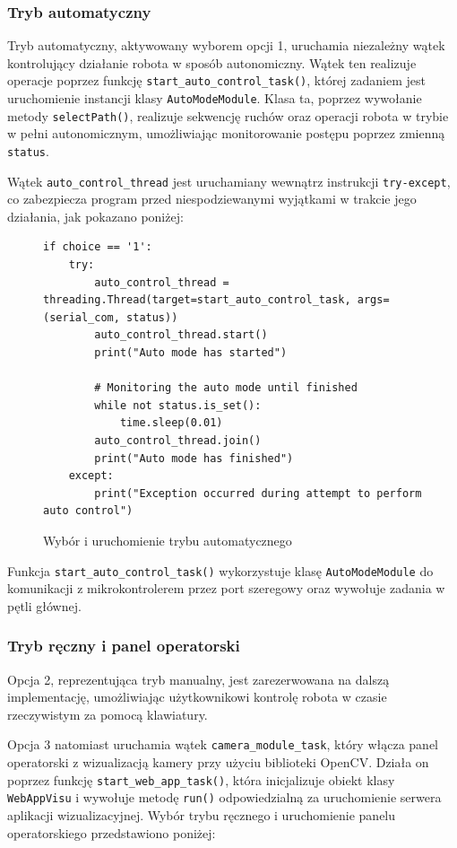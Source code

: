 \subsubsection{Tryb automatyczny}

Tryb automatyczny, aktywowany wyborem opcji 1, uruchamia niezależny wątek kontrolujący działanie robota w sposób autonomiczny. Wątek ten realizuje operacje poprzez funkcję \texttt{start\_auto\_control\_task()}, której zadaniem jest uruchomienie instancji klasy \texttt{AutoModeModule}. Klasa ta, poprzez wywołanie metody \texttt{selectPath()}, realizuje sekwencję ruchów oraz operacji robota w trybie w pełni autonomicznym, umożliwiając monitorowanie postępu poprzez zmienną \texttt{status}.

Wątek \texttt{auto\_control\_thread} jest uruchamiany wewnątrz instrukcji \texttt{try-except}, co zabezpiecza program przed niespodziewanymi wyjątkami w trakcie jego działania, jak pokazano poniżej:

\begin{figure}[h!]
  \centering
  \begin{lstlisting}
if choice == '1':
    try:
        auto_control_thread = threading.Thread(target=start_auto_control_task, args=(serial_com, status))
        auto_control_thread.start()
        print("Auto mode has started")

        # Monitoring the auto mode until finished
        while not status.is_set():
            time.sleep(0.01)
        auto_control_thread.join()
        print("Auto mode has finished")
    except:
        print("Exception occurred during attempt to perform auto control")
  \end{lstlisting}
  \caption{Wybór i uruchomienie trybu automatycznego}
  \label{fig:automode_choice}
\end{figure}

Funkcja \texttt{start\_auto\_control\_task()} wykorzystuje klasę \texttt{AutoModeModule} do komunikacji z mikrokontrolerem przez port szeregowy oraz wywołuje zadania w pętli głównej.

\subsubsection{Tryb ręczny i panel operatorski}

Opcja 2, reprezentująca tryb manualny, jest zarezerwowana na dalszą implementację, umożliwiając użytkownikowi kontrolę robota w czasie rzeczywistym za pomocą klawiatury.

Opcja 3 natomiast uruchamia wątek \texttt{camera\_module\_task}, który włącza panel operatorski z wizualizacją kamery przy użyciu biblioteki OpenCV. Działa on poprzez funkcję \texttt{start\_web\_app\_task()}, która inicjalizuje obiekt klasy \texttt{WebAppVisu} i wywołuje metodę \texttt{run()} odpowiedzialną za uruchomienie serwera aplikacji wizualizacyjnej. Wybór trybu ręcznego i uruchomienie panelu operatorskiego przedstawiono poniżej:

